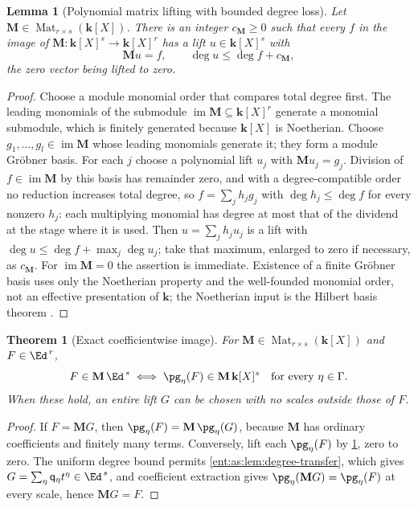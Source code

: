 \documentclass[11pt]{article}
\newtheorem{theorem}{Theorem}[section]
\theoremstyle{plain}
\newtheorem{lemma}[lemma]{Lemma}
\theoremstyle{plain}
\theoremstyle{plain}
\theoremstyle{definition}
\theoremstyle{definition}
\theoremstyle{definition}
\theoremstyle{definition}
\theoremstyle{remark}
\newcommand{\kk}{\mathbf k}\newcommand{\PP}{\mathbb P}
\begin{document}
\begin{lemma}[Polynomial matrix lifting with bounded degree loss]
\label{ent:as:lem:matrix-degree}
Let $\mathbf M\in\operatorname{Mat}_{r\times s}(\kk[X])$. There is an integer
$c_{\mathbf M}\ge0$ such that every $f$ in the image of
$\mathbf M:\kk[X]^s\to\kk[X]^r$ has a lift $u\in\kk[X]^s$ with
\[
 \mathbf Mu=f,\qquad \deg u\le\deg f+c_{\mathbf M},
\]
the zero vector being lifted to zero.
\end{lemma}
\begin{proof}
Choose a module monomial order that compares total degree first. The leading
monomials of the submodule $\operatorname{im}\mathbf M\subseteq\kk[X]^r$
generate a monomial submodule, which is finitely generated because $\kk[X]$ is
Noetherian. Choose $g_1,\ldots,g_l\in\operatorname{im}\mathbf M$ whose leading
monomials generate it; they form a module Gr\"obner basis. For each $j$ choose
a polynomial lift $u_j$ with $\mathbf Mu_j=g_j$. Division of
$f\in\operatorname{im}\mathbf M$ by this basis has remainder zero, and with a
degree-compatible order no reduction increases total degree, so
$f=\sum_jh_jg_j$ with $\deg h_j\le\deg f$ for every nonzero $h_j$: each
multiplying monomial has degree at most that of the dividend at the stage
where it is used. Then $u=\sum_jh_ju_j$ is a lift with
$\deg u\le\deg f+\max_j\deg u_j$; take that maximum, enlarged to zero if
necessary, as $c_{\mathbf M}$. For $\operatorname{im}\mathbf M=0$ the assertion
is immediate. Existence of a finite Gr\"obner basis uses only the Noetherian
property and the well-founded monomial order, not an effective presentation of
$\kk$; the Noetherian input is the Hilbert basis theorem
\cite[Lemma~10.31.1]{Stacks}.
\end{proof}

\begin{theorem}[Exact coefficientwise image]\label{ent:as:thm:matrix}
For $\mathbf M\in\operatorname{Mat}_{r\times s}(\kk[X])$ and $F\in\Ed^{\,r}$,
\begin{equation}\label{ent:as:eq:matrix-image}
 F\in\mathbf M\,\Ed^{\,s}
 \iff
 \pg_\eta(F)\in\mathbf M\,\kk[X]^s\quad\text{for every }\eta\in\Gamma .
\end{equation}
When these hold, an entire lift $G$ can be chosen with no scales outside those
of $F$.
\end{theorem}
\begin{proof}
If $F=\mathbf MG$, then $\pg_\eta(F)=\mathbf M\,\pg_\eta(G)$, because $\mathbf M$
has ordinary coefficients and finitely many terms. Conversely, lift each
$\pg_\eta(F)$ by \cref{ent:as:lem:matrix-degree}, zero to zero. The uniform
degree bound permits \cref{ent:as:lem:degree-transfer}, which gives
$G=\sum_\eta\mathsf q_\eta t^\eta\in\Ed^{\,s}$, and coefficient extraction
gives $\pg_\eta(\mathbf MG)=\pg_\eta(F)$ at every scale, hence $\mathbf MG=F$.
\end{proof}
\end{document}
